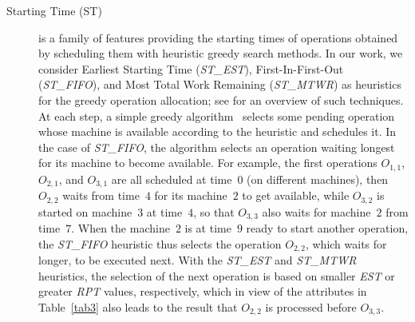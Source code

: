 \documentclass[runningheads]{llncs}
\newcommand{\stest}{\textit{ST\_EST}\xspace}
\newcommand{\stmtwr}{\textit{ST\_MTWR}\xspace}
\newcommand{\stfifo}{\textit{ST\_FIFO}\xspace}
\begin{document}
\begin{description}
  \item[Starting Time (ST)] is a family of features providing the starting times of operations obtained by scheduling them with heuristic greedy search methods. In our work, we consider Earliest Starting Time (\stest), First-In-First-Out (\stfifo), and Most Total Work Remaining (\stmtwr) as heuristics for the greedy operation allocation; see \cite{jones1998survey} for an overview of such techniques.
  At each step, a simple greedy algorithm~\cite{el2020job} selects some pending operation whose machine is available according to the heuristic and schedules it. In the case of \stfifo, the algorithm selects an operation waiting longest for its machine to become available.
  For example, the first operations $O_{1,1}$, $O_{2,1}$, and $O_{3,1}$ are all scheduled at time~$0$ (on different machines),
  then $O_{2,2}$ waits from time~$4$ for its machine~$2$ to get available,
  while $O_{3,2}$ is started on machine~$3$ at time~$4$, so that
  $O_{3,3}$ also waits for machine~$2$ from time~$7$.
  When the machine~$2$ is at time~$9$ ready to start another operation,
  the \stfifo heuristic thus selects the operation $O_{2,2}$, which waits
  for longer, to be executed next.
  With the \stest and \stmtwr heuristics,
  the selection of the next operation is based on smaller \textit{EST} or
  greater \textit{RPT} values, respectively, which in view of the attributes in Table~\ref{tab3} also leads to the result that $O_{2,2}$
  is processed before $O_{3,3}$. %


\end{description}
\end{document}
